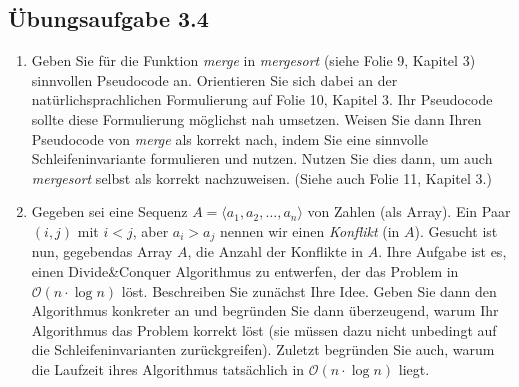 \documentclass{article}
\begin{document}
\subsection{Übungsaufgabe 3.4}
\begin{flushright}
\begin{Large}
[~~~~\string| ~~8~]
\end{Large}
\end{flushright}
\begin{enumerate}
\item Geben Sie für die Funktion \textit{merge} in \textit{mergesort} (siehe Folie 9, Kapitel 3) sinnvollen Pseudocode an.
Orientieren Sie sich dabei an der natürlichsprachlichen Formulierung auf Folie 10, Kapitel 3.
Ihr Pseudocode sollte diese Formulierung möglichst nah umsetzen.
Weisen Sie dann Ihren Pseudocode von \textit{merge} als korrekt nach, indem Sie eine sinnvolle Schleifeninvariante formulieren und nutzen.
Nutzen Sie dies dann, um auch \textit{mergesort} selbst als korrekt nachzuweisen.
(Siehe auch Folie 11, Kapitel 3.)
\item Gegeben sei eine Sequenz $A = \langle a_1,a_2,\dots,a_n \rangle$ von Zahlen (als Array).
Ein Paar $(i,j)$ mit $i<j$, aber $a_i > a_j$ nennen wir einen \textit{Konflikt} (in $A$).
Gesucht ist nun, gegebendas Array $A$, die Anzahl der Konflikte in $A$.
Ihre Aufgabe ist es, einen Divide\&Conquer Algorithmus zu entwerfen, der das Problem in $\mathcal{O}(n\cdot\operatorname{log} n)$ löst.
Beschreiben Sie zunächst Ihre Idee. Geben Sie dann den Algorithmus konkreter an und begründen Sie dann überzeugend, warum Ihr Algorithmus das Problem korrekt löst (sie müssen dazu nicht unbedingt auf die Schleifeninvarianten zurückgreifen).
Zuletzt begründen Sie auch, warum die Laufzeit ihres Algorithmus tatsächlich in $\mathcal{O}(n\cdot\operatorname{log} n)$ liegt.
\end{enumerate}
\vspace{1cm}\-\\
\end{document}
